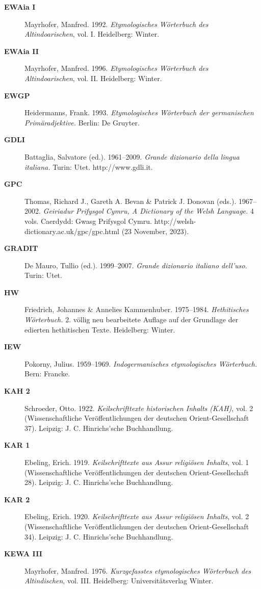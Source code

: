 \begin{description}
\item[\bfseries\upshape EWAia I]Mayrhofer, Manfred. 1992. \emph{Etymologisches Wörterbuch des Altindoarischen}, vol. I. Heidelberg: Winter.
\item[\bfseries\upshape EWAia II]Mayrhofer, Manfred. 1996. \emph{Etymologisches Wörterbuch des Altindoarischen}, vol. II. Heidelberg: Winter.
\item[\bfseries\upshape EWGP]Heidermanns, Frank. 1993. \emph{Etymologisches Wörterbuch der germanischen Primäradjektive.} Berlin: De Gruyter.
\item[\bfseries\upshape GDLI]Battaglia, Salvatore (ed.). 1961–2009. \emph{Grande dizionario della lingua italiana.} Turin: Utet. http://www.gdli.it.
\item[\bfseries\upshape GPC]Thomas, Richard J., Gareth A. Bevan \& Patrick J. Donovan (eds.). 1967–2002. \emph{Geiriadur Prifysgol Cymru, A Dictionary of the Welsh Language.} 4 vols. Caerdydd: Gwasg Prifysgol Cymru. http://welsh-dictionary.ac.uk/gpc/gpc.html   (23 November, 2023).
\item[\bfseries\upshape GRADIT]De Mauro, Tullio (ed.). 1999–2007. \emph{Grande dizionario italiano dell’uso.} Turin: Utet.
\item[\bfseries\upshape HW]Friedrich, Johannes \& Annelies Kammenhuber. 1975–1984. \emph{Hethitisches Wörterbuch.} 2. völlig neu bearbeitete Auflage auf der Grundlage der edierten hethitischen Texte. Heidelberg: Winter.
\item[\bfseries\upshape IEW]Pokorny, Julius. 1959–1969. \emph{Indogermanisches etymologisches Wörterbuch.} Bern: Francke.
\item[\bfseries\upshape KAH 2]Schroeder, Otto. 1922. \emph{Keilschrifttexte historischen Inhalts (KAH)}, vol. 2 (Wissenschaftliche Veröffentlichungen der deutschen Orient-Gesellschaft 37). Leipzig: J. C. Hinrichs’sche Buchhandlung.
\item[\bfseries\upshape KAR 1]Ebeling, Erich. 1919. \emph{Keilschrifttexte aus Assur religiösen Inhalts}, vol. 1 (Wissenschaftliche Veröffentlichungen der deutschen Orient-Gesellschaft 28). Leipzig: J. C. Hinrichs’sche Buchhandlung.
\item[\bfseries\upshape KAR 2]Ebeling, Erich. 1920. \emph{Keilschrifttexte aus Assur religiösen Inhalts}, vol. 2 (Wissenschaftliche Veröffentlichungen der deutschen Orient-Gesellschaft 34). Leipzig: J. C. Hinrichs’sche Buchhandlung.
\item[\bfseries\upshape KEWA III]Mayrhofer, Manfred. 1976. \emph{Kurzgefasstes etymologisches Wörterbuch des Altindischen}, vol. III. Heidelberg: Universitätsverlag Winter.

\end{description}
